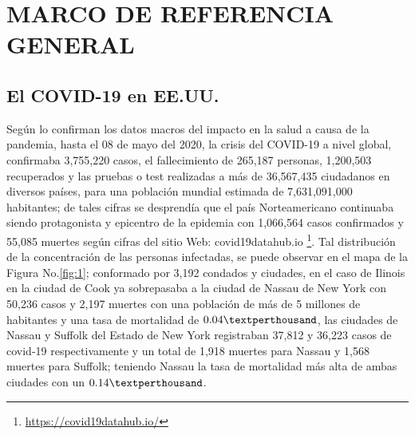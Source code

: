 
\section{MARCO DE REFERENCIA GENERAL}

\subsection{El COVID-19 en EE.UU.}

Según lo confirman los datos macros del impacto en la salud a causa de la pandemia, hasta el 08 de mayo del 2020, la crisis del COVID-19 a nivel global, confirmaba 3,755,220 casos, el fallecimiento de 265,187 personas, 1,200,503 recuperados y las pruebas o test realizadas a más de 36,567,435 ciudadanos en diversos países, para una población mundial estimada de 7,631,091,000 habitantes; de tales cifras se desprendía que el país Norteamericano continuaba siendo protagonista y epicentro de la epidemia con 1,066,564 casos confirmados  y  55,085 muertes según cifras del sitio Web: covid19datahub.io \footnote{\href{https://covid19datahub.io/}{https://covid19datahub.io/}}. Tal distribución de la concentración de las personas infectadas, se puede observar en el mapa de la Figura No.\eqref{fig:1}; conformado por 3,192 condados y ciudades, en el caso de Ilinois en la ciudad de Cook ya sobrepasaba a la ciudad de Nassau de New York con 50,236 casos y 2,197 muertes con una población de más de 5 millones de habitantes y una tasa de mortalidad de $0.04 \textperthousand$, las ciudades de Nassau y Suffolk del Estado de New York registraban 37,812 y 36,223 casos de covid-19 respectivamente y un total de 1,918 muertes para Nassau y 1,568 muertes para Suffolk; teniendo Nassau la tasa de mortalidad más alta de ambas ciudades con un $0.14 \textperthousand$.

